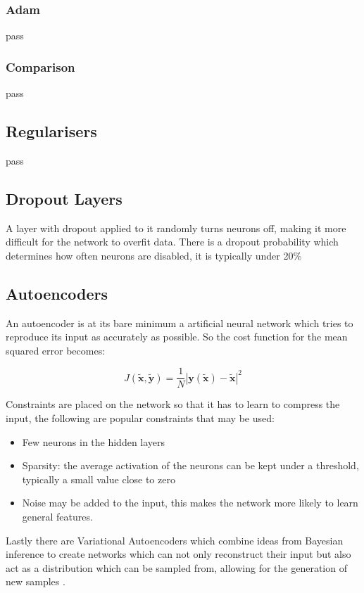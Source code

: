       \subsubsection{Adam}
        pass
      \subsubsection{Comparison}
        pass
    \subsection{Regularisers}
      pass
    \subsection{Dropout Layers} \label{sec:dropout}
      A layer with dropout applied to it randomly turns neurons off, making it more
      difficult for the network to overfit data. There is a dropout probability
      which determines how often neurons are disabled, it is typically under 20\%
    \subsection{Autoencoders}
      An autoencoder is at its bare minimum a artificial neural network which tries
      to reproduce its input as accurately as possible. So the cost function for the mean squared error becomes:

      \begin{equation} \label{eq:autoencoder_cost}
        J(\tilde{\mathbf{x}},\tilde{\mathbf{y}}) = \frac{1}{N}\left |\mathbf{y}(\tilde{\mathbf{x}})-\tilde{\mathbf{x}}\right | ^2
      \end{equation}

      Constraints are
      placed on the network so that it has to learn to compress the input, the following
      are popular constraints that may be used:
      \begin{itemize}
        \item Few neurons in the hidden layers
        \item Sparsity: the average activation of the neurons can be kept under a
        threshold, typically a small value close to zero \cite{autong}
        \item Noise may be added to the input, this makes the network more likely
        to learn general features.
      \end{itemize}
      Lastly there are Variational Autoencoders which combine ideas from Bayesian inference
      to create networks which can not only reconstruct their input but also act as a
      distribution which can be sampled from, allowing for the generation of new samples \cite{Kingma2013}.

